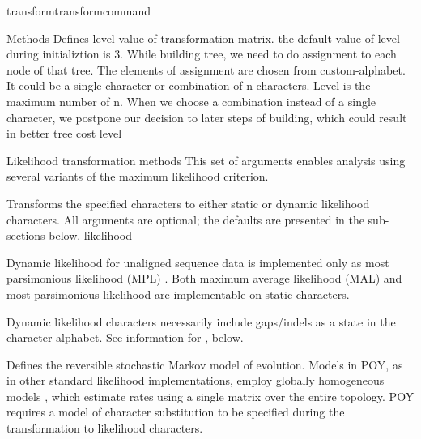 \begin{command}{transform}{transformcommand}
\begin{arguments}
\begin{argumentgroup}{Methods}
            {Defines level value of transformation matrix. the default value of
            level during initializtion is 3. While building tree, we need to
            do assignment to each node of that tree. The elements of assignment
            are chosen from custom-alphabet. It could be a single character or
            combination of n characters.  Level is the maximum number of n.
            When we choose a combination instead of a single character, we
            postpone our decision to later steps of building, which could
            result in better tree cost }
            {level}
        \end{argumentgroup}
         

        \begin{argumentgroup}{Likelihood transformation methods}
            This set of arguments enables analysis using several variants of the
            maximum likelihood criterion. 

                {Transforms the specified characters to either static or dynamic
                likelihood characters. All arguments are optional; the defaults
                are presented in the sub-sections below.}
                {likelihood}

            \begin{statement}
                Dynamic likelihood for unaligned sequence data is
                implemented only as most parsimonious likelihood (MPL)
                \cite{barryandhartigan1987}. Both maximum average likelihood (MAL) and
                most parsimonious likelihood are implementable on static
                characters.
            \end{statement}

            \begin{statement}
                Dynamic likelihood characters necessarily include gaps/indels as
                a state in the character alphabet. See information for
                , below.
            \end{statement}

                {Defines the reversible stochastic Markov model of evolution.
                Models in POY, as in other standard likelihood implementations,
                employ globally homogeneous models \cite{jayaswal2005estimation}, which
                estimate rates using a single matrix over the entire topology.
                POY requires a model of character substitution to be specified
                during the transformation to likelihood characters.

}
\end{argumentgroup}
\end{arguments}
\end{command}

